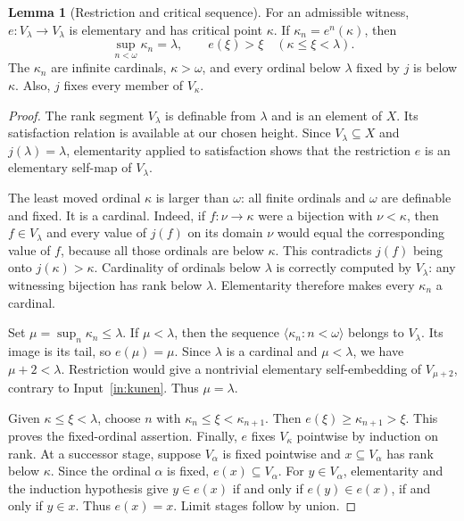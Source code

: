 \documentclass[11pt,letterpaper]{article}
\theoremstyle{definition}
\newtheorem{lemma}[definition]{Lemma}
\numberwithin{equation}{section}
\begin{document}
\begin{lemma}[Restriction and critical sequence]\label{lem:critical}
For an admissible witness, $e:V_\lambda\to V_\lambda$ is elementary and has critical point $\kappa$. If $\kappa_n=e^n(\kappa)$, then
\begin{equation}
\sup_{n<\omega}\kappa_n=\lambda,
\qquad e(\xi)>\xi\quad(\kappa\le\xi<\lambda).\label{eq:no-fixed}
\end{equation}
The $\kappa_n$ are infinite cardinals, $\kappa>\omega$, and every ordinal below $\lambda$ fixed by $j$ is below $\kappa$. Also, $j$ fixes every member of $V_\kappa$.
\end{lemma}
\begin{proof}
The rank segment $V_\lambda$ is definable from $\lambda$ and is an element of $X$. Its satisfaction relation is available at our chosen height. Since $V_\lambda\subseteq X$ and $j(\lambda)=\lambda$, elementarity applied to satisfaction shows that the restriction $e$ is an elementary self-map of $V_\lambda$.

The least moved ordinal $\kappa$ is larger than $\omega$: all finite ordinals and $\omega$ are definable and fixed. It is a cardinal. Indeed, if $f:\nu\to\kappa$ were a bijection with $\nu<\kappa$, then $f\in V_\lambda$ and every value of $j(f)$ on its domain $\nu$ would equal the corresponding value of $f$, because all those ordinals are below $\kappa$. This contradicts $j(f)$ being onto $j(\kappa)>\kappa$. Cardinality of ordinals below $\lambda$ is correctly computed by $V_\lambda$: any witnessing bijection has rank below $\lambda$. Elementarity therefore makes every $\kappa_n$ a cardinal.

Set $\mu=\sup_n\kappa_n\le\lambda$. If $\mu<\lambda$, then the sequence $\langle\kappa_n:n<\omega\rangle$ belongs to $V_\lambda$. Its image is its tail, so $e(\mu)=\mu$. Since $\lambda$ is a cardinal and $\mu<\lambda$, we have $\mu+2<\lambda$. Restriction would give a nontrivial elementary self-embedding of $V_{\mu+2}$, contrary to Input~\ref{in:kunen}. Thus $\mu=\lambda$.

Given $\kappa\le\xi<\lambda$, choose $n$ with $\kappa_n\le\xi<\kappa_{n+1}$. Then $e(\xi)\ge\kappa_{n+1}>\xi$. This proves the fixed-ordinal assertion. Finally, $e$ fixes $V_\kappa$ pointwise by induction on rank. At a successor stage, suppose $V_\alpha$ is fixed pointwise and $x\subseteq V_\alpha$ has rank below $\kappa$. Since the ordinal $\alpha$ is fixed, $e(x)\subseteq V_\alpha$. For $y\in V_\alpha$, elementarity and the induction hypothesis give $y\in e(x)$ if and only if $e(y)\in e(x)$, if and only if $y\in x$. Thus $e(x)=x$. Limit stages follow by union.
\end{proof}
\end{document}
